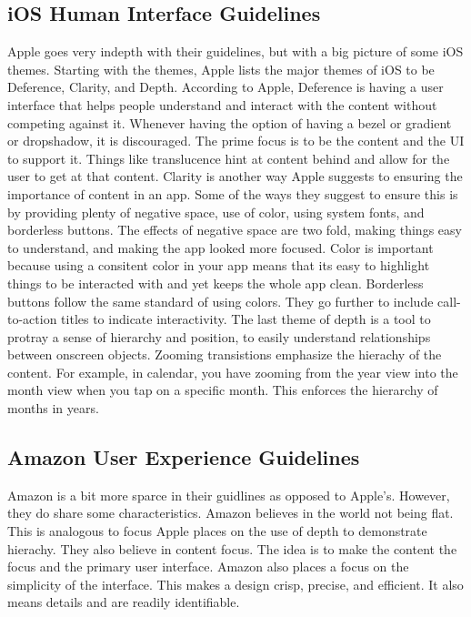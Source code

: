 \documentclass[journal,letterpaper]{article}
\begin{document}
    \subsection{iOS Human Interface Guidelines}
    Apple goes very indepth with their guidelines, but with a big picture of some iOS themes. Starting with the themes, Apple lists the major themes of iOS to be Deference, Clarity, and Depth. According to Apple, Deference is having a user interface that helps people understand and interact with the content without competing against it. Whenever having the option of having a bezel or gradient or dropshadow, it is discouraged. The prime focus is to be the content and the UI to support it. Things like translucence hint at content behind and allow for the user to get at that content. Clarity is another way Apple suggests to ensuring the importance of content in an app. Some of the ways they suggest to ensure this is by providing plenty of negative space, use of color, using system fonts, and borderless buttons. The effects of negative space are two fold, making things easy to understand, and making the app looked more focused. Color is important because using a consitent color in your app means that its easy to highlight things to be interacted with and yet keeps the whole app clean. Borderless buttons follow the same standard of using colors. They go further to include call-to-action titles to indicate interactivity. The last theme of depth is a tool to protray a sense of hierarchy and position, to easily understand relationships between onscreen objects. Zooming transistions emphasize the hierachy of the content. For example, in calendar, you have zooming from the year view into the month view when you tap on a specific month. This enforces the hierarchy of months in years. 

    \subsection{Amazon User Experience Guidelines}
    Amazon is a bit more sparce in their guidlines as opposed to Apple's. However, they do share some characteristics. Amazon believes in the world not being flat. This is analogous to focus Apple places on the use of depth to demonstrate hierachy. They also believe in content focus. The idea is to make the content the focus and the primary user interface. Amazon also places a focus on the simplicity of the interface. This makes a design crisp, precise, and efficient. It also means details and are readily identifiable. 
\end{document}
